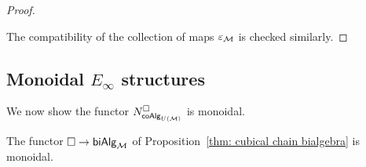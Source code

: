 \begin{proof}
\begin{center}
		\qquad
		\qquad
	\end{center}
	The compatibility of the collection of maps $\varepsilon_{\mathcal{M}}$ is checked similarly.
\end{proof}

\subsection{Monoidal $E_\infty$ structures}

We now show the functor $N^{\square}_{\mathsf{coAlg}_{U(\mathcal{M})}}$ is monoidal.
\begin{theorem} \label{chainsismonoidal}
	The functor $\square \to \mathsf{biAlg}_{\mathcal{M}}$ of Proposition~\ref{thm: cubical chain bialgebra} is monoidal.
\end{theorem}

